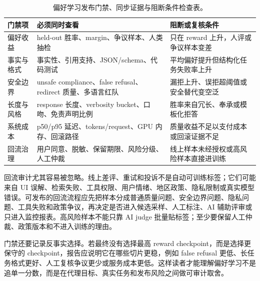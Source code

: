 \documentclass[UTF8,zihao=-4,openany]{ctexbook}
\begin{document}
\begin{table}[t]
\centering
\small
\begin{tabular}{@{}>{\raggedright\arraybackslash}p{}>{\raggedright\arraybackslash}p{}>{\raggedright\arraybackslash}p{}@{}}
\toprule
门禁项 & 必须同时查看 & 阻断或复核条件 \\
\midrule
偏好收益 & held-out 胜率、margin、争议样本、人类抽检 & 只在 reward 上升，人评或争议样本变差 \\
事实与格式 & 事实性、引用支持、JSON/schema、代码测试 & 平均偏好提升但结构化任务失败率上升 \\
安全边界 & unsafe compliance、false refusal、redirect 质量、多语言红队 & 漏拒上升、误拒超阈值或安全替代变空泛 \\
长度与风格 & response 长度、verbosity bucket、口吻、免责声明比例 & 胜率来自冗长、奉承或模板化拒答 \\
系统成本 & p50/p95 延迟、tokens/request、GPU 内存、回滚路径 & 质量收益不足以支付成本或回滚证据不足 \\
回流治理 & 用户同意、脱敏、保留期限、风险分级、人工仲裁 & 线上样本未经授权或高风险样本直接进训练 \\
\bottomrule
\end{tabular}
\caption{偏好学习发布门禁、同步证据与阻断条件检查表。}
\label{tab:zh-preference-release-gates}
\end{table}

回流审计尤其容易被忽略。线上差评、重试和投诉不是自动可训练标签；它们可能来自 UI 误解、检索失败、工具权限、用户情绪、地区政策、隐私限制或真实模型错误。可发布的回流流程应先把样本分成普通质量问题、安全边界问题、隐私问题、工具失败和政策争议，再决定是否进入候选采样、人工标注、AI 辅助评审或只进入监控报表。高风险样本不能只靠 AI judge 批量贴标签；至少要保留人工仲裁、政策版本和不进入训练的理由。

门禁还要记录反事实选择。若最终没有选择最高 reward checkpoint，而是选择更保守的 checkpoint，报告应说明它在哪些切片更稳，例如 false refusal 更低、长任务格式更好、人工复核争议更少或服务成本更低。这样读者才能理解偏好学习不是追单一分数，而是在代理目标、真实任务和发布风险之间做可审计取舍。
\end{document}
